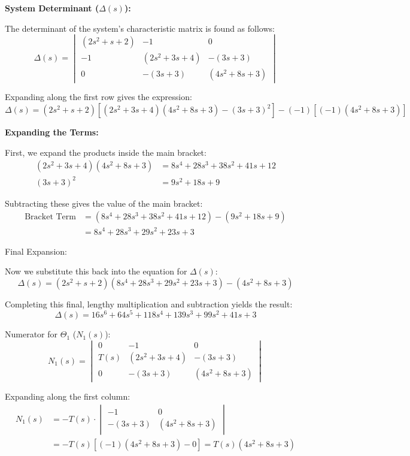 \documentclass[11pt]{article}
\begin{document}
\vspace{8pt}

\noindent\textbf{System Determinant ($\Delta(s)$):}

\vspace{5pt}

The determinant of the system's characteristic matrix is found as follows:
\[
\Delta(s) = \begin{vmatrix} (2s^2+s+2) & -1 & 0 \\ -1 & (2s^2+3s+4) & -(3s+3) \\ 0 & -(3s+3) & (4s^2+8s+3) \end{vmatrix}
\]

Expanding along the first row gives the expression:
\[
\Delta(s) = (2s^2+s+2)\left[(2s^2+3s+4)(4s^2+8s+3) - (3s+3)^2\right] - (-1)\left[(-1)(4s^2+8s+3)\right]
\]

\noindent\textbf{Expanding the Terms:}

\vspace{5pt}

First, we expand the products inside the main bracket:
\begin{align*}
    (2s^2+3s+4)(4s^2+8s+3) &= 8s^4 + 28s^3 + 38s^2 + 41s + 12 \\
    (3s+3)^2 &= 9s^2 + 18s + 9
\end{align*}

Subtracting these gives the value of the main bracket:
\begin{align*}
\text{Bracket Term} &= (8s^4 + 28s^3 + 38s^2 + 41s + 12) - (9s^2 + 18s + 9) \\
&= 8s^4 + 28s^3 + 29s^2 + 23s + 3
\end{align*}

{Final Expansion:}
\vspace{5pt}

Now we substitute this back into the equation for $\Delta(s)$:
\[
\Delta(s) = (2s^2+s+2)(8s^4 + 28s^3 + 29s^2 + 23s + 3) - (4s^2+8s+3)
\]

Completing this final, lengthy multiplication and subtraction yields the result:
\[
\Delta(s) = 16s^6 + 64s^5 + 118s^4 + 139s^3 + 99s^2 + 41s + 3
\]

{Numerator for $\Theta_1$ ($N_1(s)$):}
\[
N_1(s) = \begin{vmatrix} 0 & -1 & 0 \\ T(s) & (2s^2+3s+4) & -(3s+3) \\ 0 & -(3s+3) & (4s^2+8s+3) \end{vmatrix}
\]

Expanding along the first column:
\begin{align*}
    N_1(s) &= -T(s) \cdot \begin{vmatrix} -1 & 0 \\ -(3s+3) & (4s^2+8s+3) \end{vmatrix} \\
    &= -T(s)[(-1)(4s^2+8s+3) - 0] = T(s)(4s^2+8s+3)
\end{align*}
\end{document}
